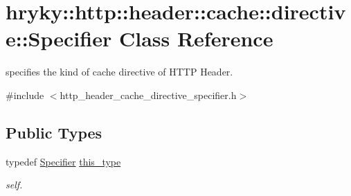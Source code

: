 \hypertarget{classhryky_1_1http_1_1header_1_1cache_1_1directive_1_1_specifier}{\section{hryky\-:\-:http\-:\-:header\-:\-:cache\-:\-:directive\-:\-:Specifier Class Reference}
\label{classhryky_1_1http_1_1header_1_1cache_1_1directive_1_1_specifier}
}


specifies the kind of cache directive of H\-T\-T\-P Header.  




{\ttfamily \#include $<$http\-\_\-header\-\_\-cache\-\_\-directive\-\_\-specifier.\-h$>$}

\subsection*{Public Types}
\begin{DoxyCompactItemize}
\item 
\hypertarget{classhryky_1_1http_1_1header_1_1cache_1_1directive_1_1_specifier_a96d34aa4110473cd361d4cb7f7df67c5}{typedef \hyperlink{classhryky_1_1http_1_1header_1_1cache_1_1directive_1_1_specifier}{Specifier} \hyperlink{classhryky_1_1http_1_1header_1_1cache_1_1directive_1_1_specifier_a96d34aa4110473cd361d4cb7f7df67c5}{this\-\_\-type}}\label{classhryky_1_1http_1_1header_1_1cache_1_1directive_1_1_specifier_a96d34aa4110473cd361d4cb7f7df67c5}

\begin{DoxyCompactList}\small\item\em self. \end{DoxyCompactList}\end{DoxyCompactItemize}
